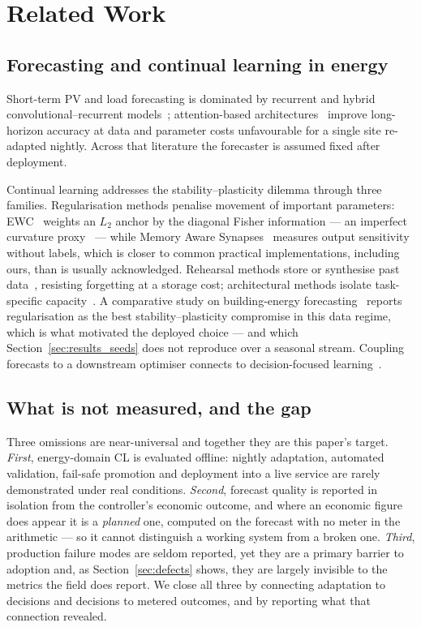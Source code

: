 \documentclass[journal]{IEEEtran}
\begin{document}
\section{Related Work}
\label{sec:related}

\subsection{Forecasting and continual learning in energy}
Short-term PV and load forecasting is dominated by recurrent and hybrid
convolutional--recurrent models~\cite{hochreiter1997long}; attention-based
architectures~\cite{vaswani2017attention,lim2021temporal} improve long-horizon
accuracy at data and parameter costs unfavourable for a single site re-adapted
nightly. Across that literature the forecaster is assumed fixed after
deployment.

Continual learning addresses the stability--plasticity dilemma through three
families. Regularisation methods penalise movement of important parameters:
EWC~\cite{kirkpatrick2017overcoming} weights an $L_2$ anchor by the diagonal
Fisher information --- an imperfect curvature
proxy~\cite{kunstner2019limitations} --- while Memory Aware
Synapses~\cite{aljundi2018memory} measures output sensitivity without labels,
which is closer to common practical implementations, including ours, than is
usually acknowledged. Rehearsal methods store or synthesise past
data~\cite{lopezpaz2017gradient,chaudhry2019efficient,shin2017continual},
resisting forgetting at a storage cost; architectural methods isolate
task-specific capacity~\cite{rusu2016progressive}. A comparative study on
building-energy forecasting~\cite{li2024building} reports regularisation as the
best stability--plasticity compromise in this data regime, which is what
motivated the deployed choice --- and which
Section~\ref{sec:results_seeds} does not reproduce over a seasonal stream.
Coupling forecasts to a downstream optimiser connects to
decision-focused learning~\cite{ng2024cost,zenke2017continual}.

\subsection{What is not measured, and the gap}
\label{sec:gap}
Three omissions are near-universal and together they are this paper's target.
\emph{First}, energy-domain CL is evaluated offline: nightly adaptation,
automated validation, fail-safe promotion and deployment into a live service
are rarely demonstrated under real conditions. \emph{Second}, forecast quality
is reported in isolation from the controller's economic outcome, and where an
economic figure does appear it is a \emph{planned} one, computed on the forecast
with no meter in the arithmetic --- so it cannot distinguish a working system
from a broken one. \emph{Third}, production failure modes are seldom reported,
yet they are a primary barrier to adoption and, as
Section~\ref{sec:defects} shows, they are largely invisible to the metrics the
field does report. We close all three by connecting adaptation to decisions and
decisions to metered outcomes, and by reporting what that connection revealed.
\end{document}
